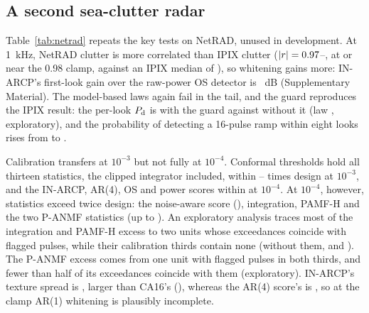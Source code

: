 \documentclass[journal]{IEEEtran}
\begin{document}
\subsection{A second sea-clutter radar}\label{sec:netrad}
\begin{table}[!t]
\centering\footnotesize
\caption{IPIX and NetRAD S-band sea clutter, same code and settings except the ANMF secondary cells (Section~\ref{sec:design}). Entries: $P_{\rm fa}/\alpha$ at $\alpha=0.01$ unless stated; guard row: per-look $P_{\rm d}$ at 10~dB, mean over looks 1--8; $P_{\rm d}$ in parentheses at 10~dB. Conformal rows: the 12 statistics other than the clipped integrator (conservative on IPIX). Injected interference 30~dB above the local power. Flagged pulses: NetRAD HH, certificate calibrated on their masks.}
\label{tab:netrad}
\setlength{\tabcolsep}{3pt}

\end{table}
Table~\ref{tab:netrad} repeats the key tests on NetRAD, unused in development. At 1~kHz, NetRAD clutter is more correlated than IPIX clutter ($|r|=0.97$--\NetAbsRMax, at or near the 0.98 clamp, against an IPIX median of \IpixAbsRMed), so whitening gains more: IN-ARCP's first-look gain over the raw-power OS detector is \NetOSGain~dB (Supplementary Material). The model-based laws again fail in the tail, and the guard reproduces the IPIX result: the per-look $P_{\rm d}$ is \NetGuardEight{} with the guard against \NetGuardZero{} without it (law \NetLawEight, exploratory), and the probability of detecting a 16-pulse ramp within eight looks rises from \NetRampZero{} to \NetRampEight.

Calibration transfers at $10^{-3}$ but not fully at $10^{-4}$. Conformal thresholds hold all thirteen statistics, the clipped integrator included, within \NetConfMinThree--\NetConfMaxThree{} times design at $10^{-3}$, and the IN-ARCP, AR(4), OS and power scores within \NetPerLookMax{} at $10^{-4}$. At $10^{-4}$, however, \NetNOverTwoFourWord{} statistics exceed twice design: the noise-aware score (\NetNaFour), integration, PAMF-H and the two P-ANMF statistics (up to \NetDwellMax). An exploratory analysis traces most of the integration and PAMF-H excess to two units whose exceedances coincide with flagged pulses, while their calibration thirds contain none (without them, \NetAttrDin{} and \NetAttrPamf). The P-ANMF excess comes from one unit with flagged pulses in both thirds, and fewer than half of its exceedances coincide with them (exploratory). IN-ARCP's texture spread is \NetSpreadIn, larger than CA16's (\NetSpreadCa), whereas the AR(4) score's is \NetSpreadInFour, so at the clamp AR(1) whitening is plausibly incomplete.
\end{document}
